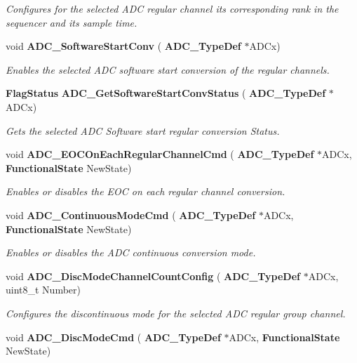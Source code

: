 \begin{DoxyCompactItemize}
\begin{DoxyCompactList}\small\item\em Configures for the selected A\+DC regular channel its corresponding rank in the sequencer and its sample time. \end{DoxyCompactList}\item 
void \textbf{ A\+D\+C\+\_\+\+Software\+Start\+Conv} (\textbf{ A\+D\+C\+\_\+\+Type\+Def} $\ast$A\+D\+Cx)
\begin{DoxyCompactList}\small\item\em Enables the selected A\+DC software start conversion of the regular channels. \end{DoxyCompactList}\item 
\textbf{ Flag\+Status} \textbf{ A\+D\+C\+\_\+\+Get\+Software\+Start\+Conv\+Status} (\textbf{ A\+D\+C\+\_\+\+Type\+Def} $\ast$A\+D\+Cx)
\begin{DoxyCompactList}\small\item\em Gets the selected A\+DC Software start regular conversion Status. \end{DoxyCompactList}\item 
void \textbf{ A\+D\+C\+\_\+\+E\+O\+C\+On\+Each\+Regular\+Channel\+Cmd} (\textbf{ A\+D\+C\+\_\+\+Type\+Def} $\ast$A\+D\+Cx, \textbf{ Functional\+State} New\+State)
\begin{DoxyCompactList}\small\item\em Enables or disables the E\+OC on each regular channel conversion. \end{DoxyCompactList}\item 
void \textbf{ A\+D\+C\+\_\+\+Continuous\+Mode\+Cmd} (\textbf{ A\+D\+C\+\_\+\+Type\+Def} $\ast$A\+D\+Cx, \textbf{ Functional\+State} New\+State)
\begin{DoxyCompactList}\small\item\em Enables or disables the A\+DC continuous conversion mode. \end{DoxyCompactList}\item 
void \textbf{ A\+D\+C\+\_\+\+Disc\+Mode\+Channel\+Count\+Config} (\textbf{ A\+D\+C\+\_\+\+Type\+Def} $\ast$A\+D\+Cx, uint8\+\_\+t Number)
\begin{DoxyCompactList}\small\item\em Configures the discontinuous mode for the selected A\+DC regular group channel. \end{DoxyCompactList}\item 
void \textbf{ A\+D\+C\+\_\+\+Disc\+Mode\+Cmd} (\textbf{ A\+D\+C\+\_\+\+Type\+Def} $\ast$A\+D\+Cx, \textbf{ Functional\+State} New\+State)

\end{DoxyCompactItemize}
